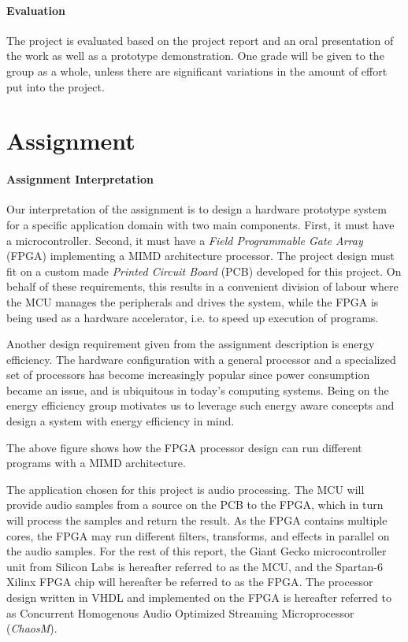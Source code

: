 \paragraph{Evaluation}
The project is evaluated based on the project report and an oral presentation of
the work as well as a prototype demonstration. One grade will be given to the
group as a whole, unless there are significant variations in the amount of
effort put into the project.

\section{Assignment}

\paragraph{Assignment Interpretation}\label{intro:our-assignment-interpretation}
Our interpretation of the assignment is to design a hardware prototype system for a
specific application domain with two main components. First, it must have a
microcontroller. Second, it must have a \textit{Field Programmable Gate Array} (FPGA)
implementing a MIMD architecture processor. The project design must fit on a custom
made \textit{Printed Circuit Board} (PCB) developed for this project. On behalf of these
requirements, this results in a convenient division of labour where the MCU manages
the peripherals and drives the system, while the FPGA is being used as a hardware
accelerator, i.e. to speed up execution of programs.

Another design requirement given from the assignment description is energy
efficiency. The hardware configuration with a general processor and a
specialized set of processors has become increasingly popular since power
consumption became an issue, and is ubiquitous in today's computing systems.
Being on the energy efficiency group motivates us to leverage such energy aware
concepts and design a system with energy efficiency in mind.


The above figure shows how the FPGA processor
design can run different programs with a MIMD architecture.

The application chosen for this project is audio processing. The MCU will
provide audio samples from a source on the PCB to the FPGA, which in turn will
process the samples and return the result. As the FPGA contains multiple cores,
the FPGA may run different filters, transforms, and effects in parallel on the
audio samples. For the rest of this report, the Giant Gecko microcontroller unit
from Silicon Labs is hereafter referred to as the MCU, and the Spartan-6 Xilinx
FPGA chip will hereafter be referred to as the FPGA. The processor design
written in VHDL and implemented on the FPGA is hereafter referred to as
Concurrent Homogenous Audio Optimized Streaming Microprocessor (\textit{ChaosM}).

